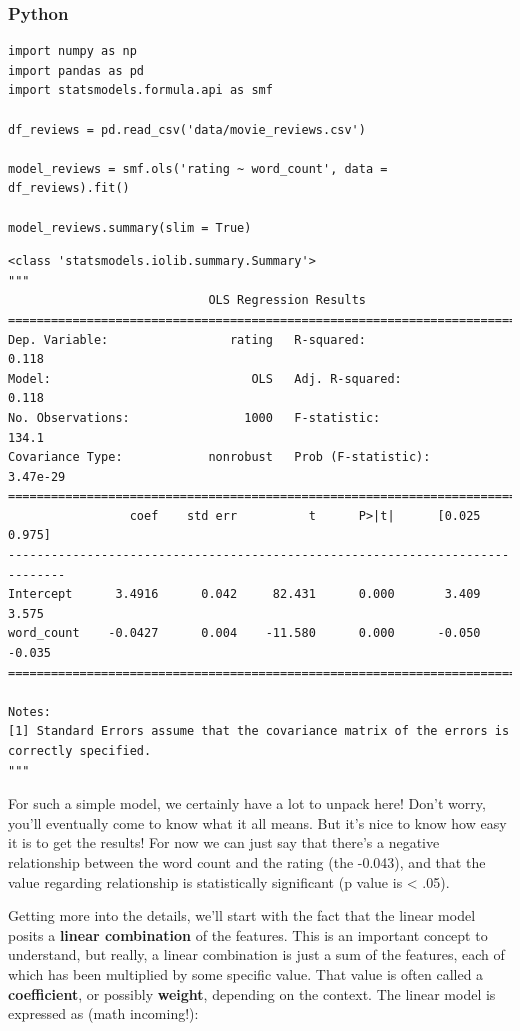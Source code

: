 \documentclass[
  letterpaper,
]{krantz}
\begin{document}
\subsubsection{Python}

\small

\begin{verbatim}
import numpy as np
import pandas as pd
import statsmodels.formula.api as smf

df_reviews = pd.read_csv('data/movie_reviews.csv')

model_reviews = smf.ols('rating ~ word_count', data = df_reviews).fit()

model_reviews.summary(slim = True)
\end{verbatim}

\begin{verbatim}
<class 'statsmodels.iolib.summary.Summary'>
"""
                            OLS Regression Results                            
==============================================================================
Dep. Variable:                 rating   R-squared:                       0.118
Model:                            OLS   Adj. R-squared:                  0.118
No. Observations:                1000   F-statistic:                     134.1
Covariance Type:            nonrobust   Prob (F-statistic):           3.47e-29
==============================================================================
                 coef    std err          t      P>|t|      [0.025      0.975]
------------------------------------------------------------------------------
Intercept      3.4916      0.042     82.431      0.000       3.409       3.575
word_count    -0.0427      0.004    -11.580      0.000      -0.050      -0.035
==============================================================================

Notes:
[1] Standard Errors assume that the covariance matrix of the errors is correctly specified.
"""
\end{verbatim}

\normalsize

For such a simple model, we certainly have a lot to unpack here! Don't
worry, you'll eventually come to know what it all means. But it's nice
to know how easy it is to get the results! For now we can just say that
there's a negative relationship between the word count and the rating
(the -0.043), and that the value regarding relationship is statistically
significant (p value is \textless{} .05).

Getting more into the details, we'll start with the fact that the linear
model posits a \textbf{linear combination} of the features. This is an
important concept to understand, but really, a linear combination is
just a sum of the features, each of which has been multiplied by some
specific value. That value is often called a \textbf{coefficient}, or
possibly \textbf{weight}, depending on the context. The linear model is
expressed as (math incoming!):
\end{document}
